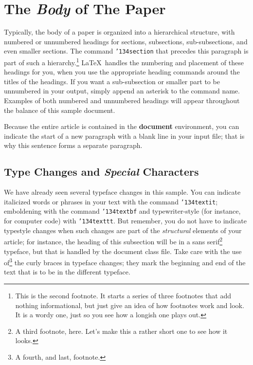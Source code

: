 \documentclass[article]{stucosrec}
\begin{document}
	\section{The \textit{Body} of The Paper}
	
	Typically, the body of a paper is organized
into a hierarchical structure, with numbered or unnumbered
headings for sections, subsections, sub-subsections, and even
smaller sections.  The command \texttt{{\char'134}section} that
precedes this paragraph is part of such a
hierarchy.\footnote{This is the second footnote. It
starts a series of three footnotes that add nothing
informational, but just give an idea of how footnotes work
and look. It is a wordy one, just so you see
how a longish one plays out.} \LaTeX\ handles the numbering
and placement of these headings for you, when you use
the appropriate heading commands around the titles
of the headings.
	If you want a sub-subsection or
smaller part to be unnumbered in your output, simply append an
asterisk to the command name.
	Examples of both
numbered and unnumbered headings will appear throughout the
balance of this sample document.
	
	Because the entire article is contained in
the \textbf{document} environment, you can indicate the
start of a new paragraph with a blank line in your
input file; that is why this sentence forms a separate paragraph.
	
	\subsection{Type Changes and \textit{Special} Characters}
	
	We have already seen several typeface changes in this sample.
	You
can indicate italicized words or phrases in your text with
the command \texttt{{\char'134}textit}; emboldening with the
command \texttt{{\char'134}textbf}
and typewriter-style (for instance, for computer code) with
\texttt{{\char'134}texttt}.
	But remember, you do not
have to indicate typestyle changes when such changes are
part of the \textit{structural} elements of your
	article; for instance, the heading of this subsection will
be in a sans serif\footnote{A third footnote, here.
Let's make this a rather short one to
see how it looks.} typeface, but that is handled by the
document class file. Take care with the use
of\footnote{A fourth, and last, footnote.}
the curly braces in typeface changes; they mark
the beginning and end of
the text that is to be in the different typeface.
	
\end{document}
